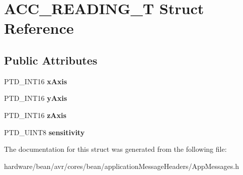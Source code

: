 \hypertarget{struct_a_c_c___r_e_a_d_i_n_g___t}{}\section{A\+C\+C\+\_\+\+R\+E\+A\+D\+I\+N\+G\+\_\+\+T Struct Reference}
\label{struct_a_c_c___r_e_a_d_i_n_g___t}
\subsection*{Public Attributes}
\begin{DoxyCompactItemize}
\item 
\hypertarget{struct_a_c_c___r_e_a_d_i_n_g___t_afd4a389ac161d7dd67a0f5955368df39}{}P\+T\+D\+\_\+\+I\+N\+T16 {\bfseries x\+Axis}\label{struct_a_c_c___r_e_a_d_i_n_g___t_afd4a389ac161d7dd67a0f5955368df39}

\item 
\hypertarget{struct_a_c_c___r_e_a_d_i_n_g___t_ac816a3b3d0e12c83458c8a5b5dbfaf90}{}P\+T\+D\+\_\+\+I\+N\+T16 {\bfseries y\+Axis}\label{struct_a_c_c___r_e_a_d_i_n_g___t_ac816a3b3d0e12c83458c8a5b5dbfaf90}

\item 
\hypertarget{struct_a_c_c___r_e_a_d_i_n_g___t_ac7b2fe087dbbf046ce51893a032c662e}{}P\+T\+D\+\_\+\+I\+N\+T16 {\bfseries z\+Axis}\label{struct_a_c_c___r_e_a_d_i_n_g___t_ac7b2fe087dbbf046ce51893a032c662e}

\item 
\hypertarget{struct_a_c_c___r_e_a_d_i_n_g___t_a26626c8cd8cbebee04c55efb32ac357e}{}P\+T\+D\+\_\+\+U\+I\+N\+T8 {\bfseries sensitivity}\label{struct_a_c_c___r_e_a_d_i_n_g___t_a26626c8cd8cbebee04c55efb32ac357e}

\end{DoxyCompactItemize}


The documentation for this struct was generated from the following file\+:\begin{DoxyCompactItemize}
\item 
hardware/bean/avr/cores/bean/application\+Message\+Headers/App\+Messages.\+h\end{DoxyCompactItemize}
